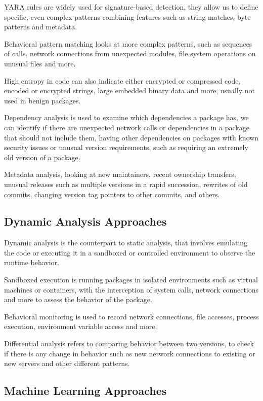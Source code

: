 YARA rules are widely used for signature-based detection, they allow us to define specific, even complex patterns combining features such as string matches, byte patterns and metadata.

Behavioral pattern matching looks at more complex patterns, such as sequences of calls, network connections from unexpected modules, file system operations on unusual files and more.

High entropy in code can also indicate either encrypted or compressed code, encoded or encrypted strings, large embedded binary data and more, usually not used in benign packages.

Dependency analysis is used to examine which dependencies a package has, we can identify if there are unexpected network calls or dependencies in a package that should not include them, having other dependencies on packages with known security issues or unusual version requirements, such as requiring an extremely old version of a package.

Metadata analysis, looking at new maintainers, recent ownership transfers, unusual releases such as multiple versions in a rapid succession, rewrites of old commits, changing version tag pointers to other commits, and others.

\subsection{Dynamic Analysis Approaches}\label{sect:dynamic-analysis}

Dynamic analysis is the counterpart to static analysis, that involves emulating the code or executing it in a sandboxed or controlled environment to observe the runtime behavior.

Sandboxed execution is running packages in isolated environments such as virtual machines or containers, with the interception of system calls, network connections and more to assess the behavior of the package.

Behavioral monitoring is used to record network connections, file accesses, process execution, environment variable access and more.

Differential analysis refers to comparing behavior between two versions, to check if there is any change in behavior such as new network connections to existing or new servers and other different patterns.

\subsection{Machine Learning Approaches}\label{sect:ml-analysis}

